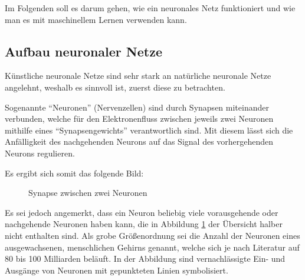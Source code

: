 \documentclass[12pt,a4]{article}
\begin{document}
Im Folgenden soll es darum gehen, wie ein neuronales Netz funktioniert und wie man es mit maschinellem Lernen verwenden kann.

\subsection{Aufbau neuronaler Netze \cite{NeuronaleNetzeImKlartext}}
Künstliche neuronale Netze sind sehr stark an natürliche neuronale Netze angelehnt, weshalb es sinnvoll ist, zuerst diese zu betrachten.

Sogenannte \enquote{Neuronen} (Nervenzellen) sind durch Synapsen miteinander verbunden, welche für den Elektronenfluss zwischen jeweils zwei Neuronen mithilfe eines \enquote{Synapsengewichts} verantwortlich sind. Mit diesem lässt sich die Anfälligkeit des nachgehenden Neurons auf das Signal des  vorhergehenden Neurons regulieren. \cite{Synapsengewicht}

Es ergibt sich somit das folgende Bild:
\begin{figure}[!h]
\centering
{}
\caption{Synapse zwischen zwei Neuronen}
\label{fig:Neuronenverbindung}
\end{figure}

Es sei jedoch angemerkt, dass ein Neuron beliebig viele vorausgehende oder nachgehende Neuronen haben kann, die in Abbildung \ref{fig:Neuronenverbindung} der Übersicht halber nicht enthalten sind. Als grobe Größenordnung sei die Anzahl der Neuronen eines ausgewachsenen, menschlichen Gehirns genannt, welche sich je nach Literatur auf 80 bis 100 Milliarden beläuft. In der Abbildung sind vernachlässigte Ein- und Ausgänge von Neuronen mit gepunkteten Linien symbolisiert.
\end{document}

